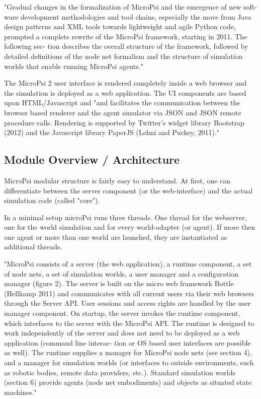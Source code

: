 "Gradual changes in the formalization of MicroPsi and the emergence of new soft- ware development methodologies and tool chains, especially the move from Java design patterns and XML tools towards lightweight and agile Python code, prompted a complete rewrite of the MicroPsi framework, starting in 2011. The following sec- tion describes the overall structure of the framework, followed by detailed definitions of the node net formalism and the structure of simulation worlds that enable running MicroPsi agents."~\cite{conf/agi/Bach12}

The MicroPsi 2 user interface is rendered completely inside a web browser and the simulation is deployed as a web application. The UI components are based upon HTML/Javascript and "and facilitates the communication between the browser based renderer and the agent simulator via JSON and JSON remote procedure calls. Rendering is supported by Twitter’s widget library Bootstrap (2012) and the Javascript library PaperJS (Lehni and Puckey, 2011)."~\cite{conf/agi/Bach12}

        \subsection{Module Overview / Architecture}
MicroPsi modular structure is fairly easy to understand. At first, one can differentiate between the server component (or the web-interface) and the actual simulation code (called "core").

In a minimal setup microPsi runs three threads. One thread for the webserver, one for the world simulation and for every world-adapter (or agent). If more then one agent or more than one world are launched, they are instantiated as additional threads.

"MicroPsi consists of a server (the web application), a runtime component, a set of node nets, a set of simulation worlds, a user manager and a configuration manager (figure 2). The server is built on the micro web framework Bottle (Hellkamp 2011) and communicates with all current users via their web browsers through the Server API. User sessions and access rights are handled by the user manager component.
On startup, the server invokes the runtime component, which interfaces to the server with the MicroPsi API. The runtime is designed to work independently of the server and does not need to be deployed as a web application (command line interac- tion or OS based user interfaces are possible as well).
The runtime supplies a manager for MicroPsi node nets (see section 4), and a manager for simulation worlds (or interfaces to outside environments, such as robotic bodies, remote data providers, etc.). Standard simulation worlds (section 6) provide agents (node net embodiments) and objects as situated state machines."~\cite{conf/agi/Bach12}

